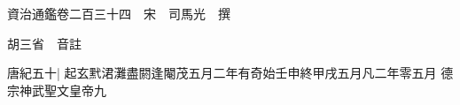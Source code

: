 






























































資治通鑑卷二百三十四　宋　司馬光　撰

胡三省　音註

唐紀五十|{
	起玄黓涒灘盡閼逢閹茂五月二年有奇始壬申終甲戌五月凡二年零五月}
德宗神武聖文皇帝九

